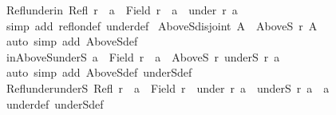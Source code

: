 \begin{isabellebody}
\ Refl{\isacharunderscore}{\kern0pt}under{\isacharunderscore}{\kern0pt}in{\isacharcolon}{\kern0pt}\ {\isachardoublequoteopen}Refl\ r\ {\isasymLongrightarrow}\ a\ {\isasymin}\ Field\ r\ {\isasymLongrightarrow}\ a\ {\isasymin}\ under\ r\ a{\isachardoublequoteclose}\isanewline
%
\isadelimproof
\ \ %
\endisadelimproof
%
\isatagproof
{}\isamarkupfalse%
\ {\isacharparenleft}{\kern0pt}simp\ add{\isacharcolon}{\kern0pt}\ refl{\isacharunderscore}{\kern0pt}on{\isacharunderscore}{\kern0pt}def\ under{\isacharunderscore}{\kern0pt}def{\isacharparenright}{\kern0pt}%
\endisatagproof
{\isafoldproof}%
%
\isadelimproof
\isanewline
%
\endisadelimproof
\isanewline
{}\isamarkupfalse%
\ AboveS{\isacharunderscore}{\kern0pt}disjoint{\isacharcolon}{\kern0pt}\ {\isachardoublequoteopen}A\ {\isasyminter}\ {\isacharparenleft}{\kern0pt}AboveS\ r\ A{\isacharparenright}{\kern0pt}\ {\isacharequal}{\kern0pt}\ {\isacharbraceleft}{\kern0pt}{\isacharbraceright}{\kern0pt}{\isachardoublequoteclose}\isanewline
%
\isadelimproof
\ \ %
\endisadelimproof
%
\isatagproof
{}\isamarkupfalse%
\ {\isacharparenleft}{\kern0pt}auto\ simp\ add{\isacharcolon}{\kern0pt}\ AboveS{\isacharunderscore}{\kern0pt}def{\isacharparenright}{\kern0pt}%
\endisatagproof
{\isafoldproof}%
%
\isadelimproof
\isanewline
%
\endisadelimproof
\isanewline
{}\isamarkupfalse%
\ in{\isacharunderscore}{\kern0pt}AboveS{\isacharunderscore}{\kern0pt}underS{\isacharcolon}{\kern0pt}\ {\isachardoublequoteopen}a\ {\isasymin}\ Field\ r\ {\isasymLongrightarrow}\ a\ {\isasymin}\ AboveS\ r\ {\isacharparenleft}{\kern0pt}underS\ r\ a{\isacharparenright}{\kern0pt}{\isachardoublequoteclose}\isanewline
%
\isadelimproof
\ \ %
\endisadelimproof
%
\isatagproof
{}\isamarkupfalse%
\ {\isacharparenleft}{\kern0pt}auto\ simp\ add{\isacharcolon}{\kern0pt}\ AboveS{\isacharunderscore}{\kern0pt}def\ underS{\isacharunderscore}{\kern0pt}def{\isacharparenright}{\kern0pt}%
\endisatagproof
{\isafoldproof}%
%
\isadelimproof
\isanewline
%
\endisadelimproof
\isanewline
{}\isamarkupfalse%
\ Refl{\isacharunderscore}{\kern0pt}under{\isacharunderscore}{\kern0pt}underS{\isacharcolon}{\kern0pt}\ {\isachardoublequoteopen}Refl\ r\ {\isasymLongrightarrow}\ a\ {\isasymin}\ Field\ r\ {\isasymLongrightarrow}\ under\ r\ a\ {\isacharequal}{\kern0pt}\ underS\ r\ a\ {\isasymunion}\ {\isacharbraceleft}{\kern0pt}a{\isacharbraceright}{\kern0pt}{\isachardoublequoteclose}\isanewline
%
\isadelimproof
\ \ %
\endisadelimproof
%
\isatagproof
{}\isamarkupfalse%
\ under{\isacharunderscore}{\kern0pt}def\ underS{\isacharunderscore}{\kern0pt}def\isanewline

\end{isabellebody}
